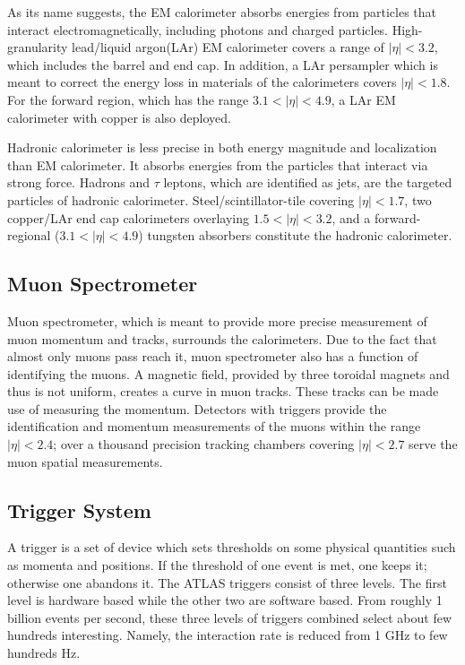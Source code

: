 \documentclass[class=NCU_thesis, crop=false]{standalone}
\begin{document}
		As its name suggests, the EM calorimeter absorbs energies from particles that interact electromagnetically, including photons and charged particles. High-granularity lead/liquid argon(LAr) EM calorimeter covers a range of $\lvert \eta \rvert < 3.2$, which includes the barrel and end cap. In addition, a LAr persampler which is meant to correct the energy loss in materials of the calorimeters covers $\lvert \eta \rvert < 1.8$. For the forward region, which has the range $3.1 < \lvert \eta \rvert < 4.9$, a LAr EM calorimeter with copper is also deployed.
		
		Hadronic calorimeter is less precise in both energy magnitude and localization than EM calorimeter. It absorbs energies from the particles that interact via strong force. Hadrons and $\tau$ leptons, which are identified as jets, are the targeted particles of hadronic calorimeter. Steel/scintillator-tile covering $\lvert \eta \rvert < 1.7$, two copper/LAr end cap calorimeters overlaying $1.5 < \lvert \eta \rvert < 3.2$, and a forward-regional ($3.1 < \lvert \eta \rvert < 4.9$) tungsten absorbers constitute the hadronic calorimeter.
	
	\subsection{Muon Spectrometer}
		Muon spectrometer, which is meant to provide more precise measurement of muon momentum and tracks, surrounds the calorimeters. Due to the fact that almost only muons pass reach it, muon spectrometer also has a function of identifying the muons. A magnetic field, provided by three toroidal magnets and thus is not uniform, creates a curve in muon tracks. These tracks can be made use of measuring the momentum. Detectors with triggers provide the identification and momentum measurements of the muons within the range $\lvert \eta \rvert < 2.4$; over a thousand precision tracking chambers covering $\lvert \eta \rvert < 2.7$ serve the muon spatial measurements.
		
	\subsection{Trigger System}
		A trigger is a set of device which sets thresholds on some physical quantities such as momenta and positions. If the threshold of one event is met, one keeps it; otherwise one abandons it. The ATLAS triggers consist of three levels. The first level is hardware based while the other two are software based. From roughly 1 billion events per second, these three levels of triggers combined select about few hundreds interesting. Namely, the interaction rate is reduced from 1 GHz to few hundreds Hz.
		
\end{document}
